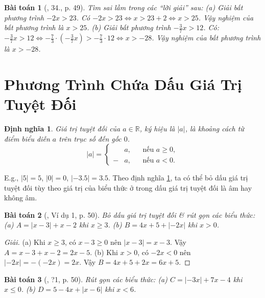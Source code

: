 \documentclass{article}
\newtheorem{baitoan}{Bài toán}
\newtheorem{dinhnghia}{Định nghĩa}
\begin{document}
\begin{baitoan}[\cite{SGK_Toan_8_tap_2}, 34., p. 49]
	Tìm sai lầm trong các ``lời giải'' sau: (a) Giải bất phương trình $-2x > 23$. Có $-2x > 23\Leftrightarrow x > 23 + 2\Leftrightarrow x > 25$. Vậy nghiệm của bất phương trình là $x > 25$. (b) Giải bất phương trình $-\frac{3}{7}x > 12$. Có: $-\frac{3}{7}x > 12\Leftrightarrow-\frac{7}{3}\cdot\left(-\frac{3}{7}x\right) > -\frac{7}{3}\cdot12\Leftrightarrow x > -28$. Vậy nghiệm của bất phương trình là $x > -28$.
\end{baitoan}


\section{Phương Trình Chứa Dấu Giá Trị Tuyệt Đối}

\begin{dinhnghia}
	\label{def: abs}
	\emph{Giá trị tuyệt đối} của $a\in\mathbb{R}$, ký hiệu là $|a|$, là khoảng cách từ điểm biểu diễn $a$ trên trục số đến gốc $0$.
	\begin{equation*}
		|a| = \left\{\begin{split}
			&a,&&\mbox{nếu }a\ge0,\\
			-&a,&&\mbox{nếu }a < 0.
		\end{split}\right.
	\end{equation*}
\end{dinhnghia}
E.g., $|5| = 5$, $|0| = 0$, $|-3.5| = 3.5$. Theo định nghĩa \ref{def: abs}, ta có thể bỏ dấu giá trị tuyệt đối tùy theo giá trị của biểu thức ở trong dấu giá trị tuyệt đối là âm hay không âm.

\begin{baitoan}[\cite{SGK_Toan_8_tap_2}, Ví dụ 1, p. 50]
	Bỏ dấu giá trị tuyệt đối \& rút gọn các biểu thức: (a) $A = |x - 3| + x - 2$ khi $x\ge3$. (b) $B = 4x + 5 + |-2x|$ khi $x > 0$.
\end{baitoan}

\begin{proof}[Giải]
	(a) Khi $x\ge3$, có $x - 3\ge0$ nên $|x - 3| = x - 3$. Vậy $A = x - 3 + x - 2 = 2x - 5$. (b) Khi $x > 0$, có $-2x < 0$ nên $|-2x| = -(-2x) = 2x$. Vậy $B = 4x + 5 + 2x = 6x + 5$.
\end{proof}

\begin{baitoan}[\cite{SGK_Toan_8_tap_2}, ?1, p. 50]
	Rút gọn các biểu thức: (a) $C = |-3x| + 7x - 4$ khi $x\le0$. (b) $D = 5 - 4x + |x - 6|$ khi $x < 6$.
\end{baitoan}
\end{document}
